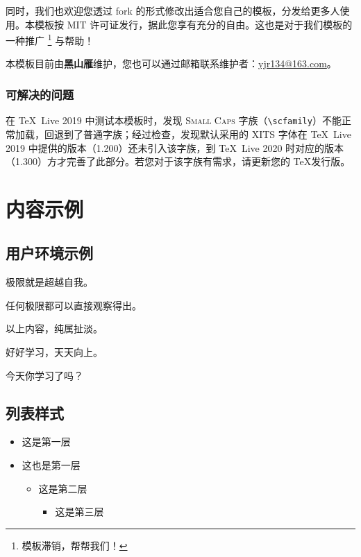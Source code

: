 \documentclass[
  xits = false,
  10pt,
  twoside,
  openany,
  b5paper, %
  colorscheme = basic %
]{qyxf-book}
\begin{document}
同时，我们也欢迎您透过 fork 的形式修改出适合您自己的模板，分发给更多人使用。本模板按 MIT 许可证发行，据此您享有充分的自由。这也是对于我们模板的一种推广
\footnote{模板滞销，帮帮我们！}
与帮助！

本模板目前由\textbf{黑山雁}维护，您也可以通过邮箱联系维护者：\url{yjr134@163.com}。

\subsection{可解决的问题}

在 \TeX\ Live 2019 中测试本模板时，发现 \textsc{Small Caps} 字族（\verb|\scfamily|）不能正常加载，回退到了普通字族；经过检查，发现默认采用的 XITS 字体在 \TeX\ Live 2019 中提供的版本（1.200）还未引入该字族，到 \TeX\ Live 2020 时对应的版本（1.300）方才完善了此部分。若您对于该字族有需求，请更新您的 \TeX 发行版。

\chapter{内容示例}
\section{用户环境示例}

\begin{define}
  极限就是超越自我。
\end{define}

\begin{theorem}
  任何极限都可以直接观察得出。
\end{theorem}

\begin{lemma}
  以上内容，纯属扯淡。
\end{lemma}

\begin{note}
  好好学习，天天向上。
\end{note}

\begin{alert}
  今天你学习了吗？
\end{alert}

\section{列表样式}
\begin{itemize}
  \item 这是第一层
  \item 这也是第一层
  \begin{itemize}
    \item 这是第二层
    \begin{itemize}
      \item 这是第三层
    \end{itemize}
  \end{itemize}
\end{itemize}
\end{document}
